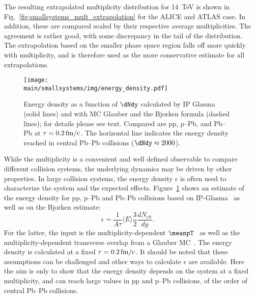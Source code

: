 \documentclass[../report.tex]{subfiles}
\providecommand{\main}{..}
\begin{document}
The resulting extrapolated multiplicity distribution for 14~TeV is shown in Fig.~\ref{fig:smallsystems_mult_extrapolation} for the ALICE and ATLAS case. In addition, these are compared scaled by their respective average multiplicities. The agreement is rather good, with some discrepancy in the tail of the distribution. The extrapolation based on the smaller phase space region falls off more quickly with multiplicity, and is therefore used as the more conservative estimate for all extrapolations.

\begin{figure}[ht]
\centering
\texttt{[image: \\main/smallsystems/img/energy\_density.pdf]}
\caption{Energy density as a function of $\dNdy$ calculated by IP Glasma (solid lines) and with MC Glauber and the Bjorken formula (dashed lines); for details please see text. Compared are pp, p--Pb, and Pb--Pb at $\tau = \unit[0.2]{fm/c}$. The horizontal line indicates the energy density reached in central Pb--Pb collisions ($\dNdy \approx 2000$).}
\label{fig:energy_density}
\end{figure}

While the multiplicity is a convenient and well defined observable to compare different collision systems, the underlying dynamics may be driven by other properties. In large collision systems, the energy density $\epsilon$ is often used to characterize the system and the expected effects. Figure~\ref{fig:energy_density} shows an estimate of the energy density for pp, p--Pb and Pb--Pb collisions based on IP-Glasma~\cite{Bzdak:2013zma,SchenkePriv1} as well as on the Bjorken estimate:
\begin{equation}
  \epsilon = \frac{1}{A \tau} \langle E \rangle \frac{3}{2} \frac{dN_{ch}}{dy}.
\end{equation}
For the latter, the input is the multiplicity-dependent $\meanpT$~\cite{Abelev:2013bla,Acharya:2018njl} as well as the multiplicity-dependent transverse overlap from a Glauber MC~\cite{Loizides:2017ack}. The energy density is calculated at a fixed $\tau = \unit[0.2]{fm/c}$. It should be noted that these assumptions can be challenged and other ways to calculate $\epsilon$ are available. Here the aim is only to show that the energy density depends on the system at a fixed multiplicity, and can reach large values in pp and p--Pb collisions, of the order of central Pb--Pb collisions.
\end{document}
